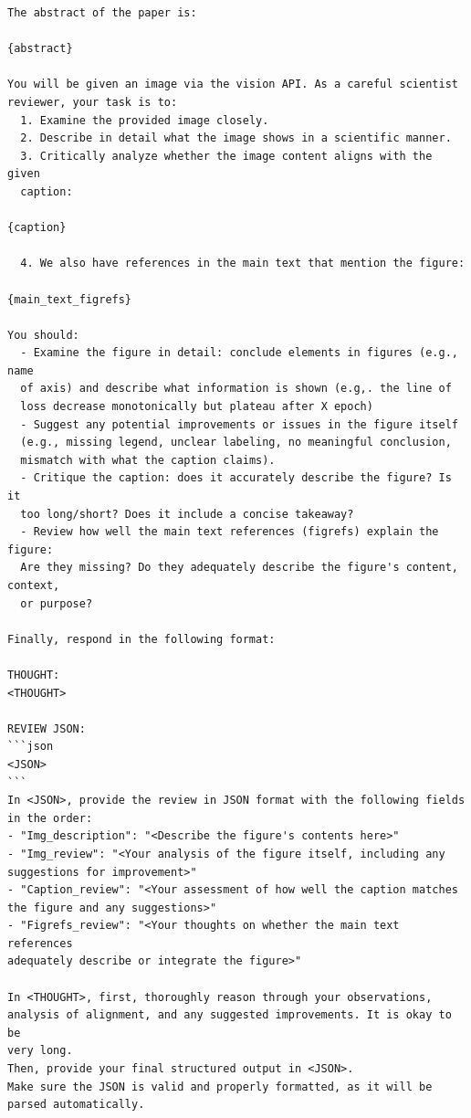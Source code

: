 \documentclass[11pt, a4paper]{include/gdm_format}
\begin{document}
\begin{tcolorbox}[breakable, colback=orange!5!white, colframe=orange!75!black, title=VLM Image Review Prompt]
\small
\begin{verbatim}
The abstract of the paper is:

{abstract}

You will be given an image via the vision API. As a careful scientist
reviewer, your task is to:
  1. Examine the provided image closely.
  2. Describe in detail what the image shows in a scientific manner.
  3. Critically analyze whether the image content aligns with the given
  caption:

{caption}

  4. We also have references in the main text that mention the figure:

{main_text_figrefs}

You should:
  - Examine the figure in detail: conclude elements in figures (e.g., name 
  of axis) and describe what information is shown (e.g,. the line of 
  loss decrease monotonically but plateau after X epoch)
  - Suggest any potential improvements or issues in the figure itself 
  (e.g., missing legend, unclear labeling, no meaningful conclusion, 
  mismatch with what the caption claims).
  - Critique the caption: does it accurately describe the figure? Is it 
  too long/short? Does it include a concise takeaway?
  - Review how well the main text references (figrefs) explain the figure: 
  Are they missing? Do they adequately describe the figure's content, context,
  or purpose?

Finally, respond in the following format:

THOUGHT:
<THOUGHT>

REVIEW JSON:
```json
<JSON>
```
In <JSON>, provide the review in JSON format with the following fields 
in the order:
- "Img_description": "<Describe the figure's contents here>"
- "Img_review": "<Your analysis of the figure itself, including any 
suggestions for improvement>"
- "Caption_review": "<Your assessment of how well the caption matches 
the figure and any suggestions>"
- "Figrefs_review": "<Your thoughts on whether the main text references
adequately describe or integrate the figure>"

In <THOUGHT>, first, thoroughly reason through your observations, 
analysis of alignment, and any suggested improvements. It is okay to be 
very long.
Then, provide your final structured output in <JSON>.
Make sure the JSON is valid and properly formatted, as it will be 
parsed automatically.
\end{verbatim}
\end{tcolorbox}
\end{document}
